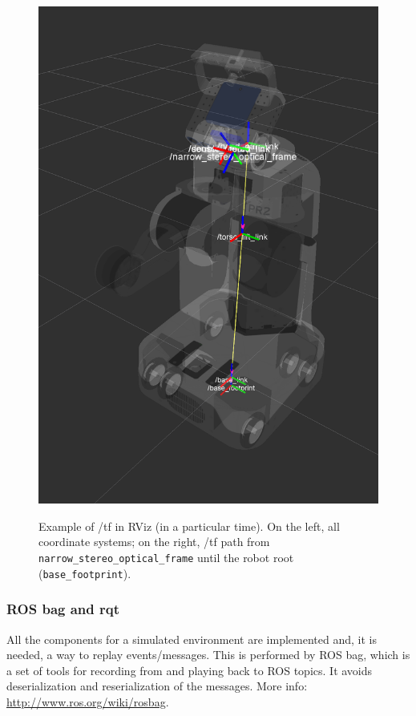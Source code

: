 \begin{figure}[!htbp]
{    \centering\includegraphics[height=0.3\textheight]{images/screenshots/tf02.png}
    \label{fig:tf02}
  }
  \caption{Example of /tf in RViz (in a particular time). On the left, all coordinate systems; on the right, /tf path from \texttt{narrow\_stereo\_optical\_frame} until the robot root (\texttt{base\_footprint}).}
   \label{fig:tf}
\end{figure}


\subsubsection{ROS bag and rqt}
\label{sec:rosbag}

All the components for a simulated environment are implemented and, it is needed, a way to replay events/messages. This is performed by ROS bag, which is a set of tools for recording from and playing back to ROS topics. It avoids deserialization and reserialization of the messages. More info: \url{http://www.ros.org/wiki/rosbag}.


